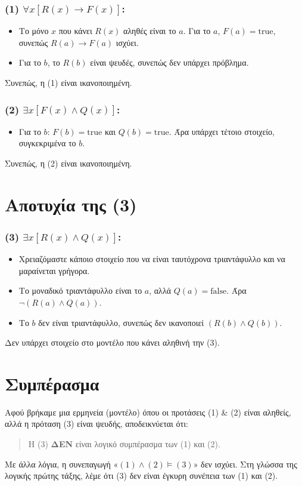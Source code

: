 \documentclass[a4paper,12pt]{article}
\begin{document}
\subsubsection*{(1) \(\forall x [R(x) \to F(x)]\):}
\begin{itemize}
    \item Το μόνο \(x\) που κάνει \(R(x)\) αληθές είναι το \(a\). Για το \(a\), \(F(a) = \text{true}\), συνεπώς \(R(a) \to F(a)\) ισχύει.
    \item Για το \(b\), το \(R(b)\) είναι ψευδές, συνεπώς δεν υπάρχει πρόβλημα.
\end{itemize}
Συνεπώς, η (1) είναι ικανοποιημένη.

\subsubsection*{(2) \(\exists x [F(x) \wedge Q(x)]\):}
\begin{itemize}
    \item Για το \(b\): \(F(b) = \text{true}\) και \(Q(b) = \text{true}\). Άρα υπάρχει τέτοιο στοιχείο, συγκεκριμένα το \(b\).
\end{itemize}
Συνεπώς, η (2) είναι ικανοποιημένη.

\section*{Αποτυχία της (3)}

\subsubsection*{(3) \(\exists x [R(x) \wedge Q(x)]\):}
\begin{itemize}
    \item Χρειαζόμαστε κάποιο στοιχείο που να είναι ταυτόχρονα τριαντάφυλλο και να μαραίνεται γρήγορα.
    \item Το μοναδικό τριαντάφυλλο είναι το \(a\), αλλά \(Q(a) = \text{false}\). Άρα \(\neg (R(a) \wedge Q(a))\).
    \item Το \(b\) δεν είναι τριαντάφυλλο, συνεπώς δεν ικανοποιεί \((R(b) \wedge Q(b))\).
\end{itemize}
Δεν υπάρχει στοιχείο στο μοντέλο που κάνει αληθινή την (3).

\section*{Συμπέρασμα}

Αφού βρήκαμε μια ερμηνεία (μοντέλο) όπου οι προτάσεις (1) \& (2) είναι αληθείς, αλλά η πρόταση (3) είναι ψευδής, αποδεικνύεται ότι:
\begin{quote}
Η (3) \textbf{ΔΕΝ} είναι λογικό συμπέρασμα των (1) και (2).
\end{quote}
Με άλλα λόγια, η συνεπαγωγή «\((1) \wedge (2) \models (3)\)» δεν ισχύει. Στη γλώσσα της λογικής πρώτης τάξης, λέμε ότι (3) δεν είναι έγκυρη συνέπεια των (1) και (2).
\end{document}
